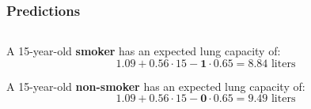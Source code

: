 \documentclass{beamer}
\newenvironment{VerbatimOUT}
 {\VerbatimEnvironment
  \begin{tcolorbox}[
    breakable,
    spartan
  ]%
  \begin{Verbatim}}
 {\end{Verbatim}\end{tcolorbox}}
\begin{document}
\begin{frame}[fragile]
\frametitle{Predictions}
    \begin{columns}
        \begin{column}{0.5\textwidth}
          A 15-year-old \textbf{smoker} has an expected lung capacity of:
          \begin{equation*}
          1.09 + 0.56 \cdot 15 - \mathbf{1} \cdot 0.65 = 8.84 \text{ liters}
          \end{equation*}
          \vspace{0.3cm}
          
          A 15-year-old \textbf{non-smoker} has an expected lung capacity of:
          \begin{equation*}
          1.09 + 0.56 \cdot 15 - \mathbf{0} \cdot 0.65 = 9.49 \text{ liters}
          \end{equation*}
        \end{column}
    \end{columns}
\end{frame}
\end{document}
